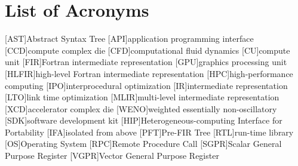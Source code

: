 \section*{List of Acronyms}

\begin{acronym}[paper]
[AST]{Abstract Syntax Tree}
[API]{application programming interface}
[CCD]{compute complex die}
[CFD]{computational fluid dynamics}
[CU]{compute unit}
[FIR]{Fortran intermediate representation}
[GPU]{graphics processing unit}
[HLFIR]{high-level Fortran intermediate representation}
[HPC]{high-performance computing}
[IPO]{interprocedural optimization}
[IR]{intermediate representation}
[LTO]{link time optimization}
[MLIR]{multi-level intermediate representation}
[XCD]{accelerator complex die}
[WENO]{weighted essentially non-oscillatory}
[SDK]{software development kit}
[HIP]{Heterogeneous-computing Interface for Portability}
[IFA]{isolated from above}
[PFT]{Pre-FIR Tree}
[RTL]{run-time library}
[OS]{Operating System}
[RPC]{Remote Procedure Call}
[SGPR]{Scalar General Purpose Register}
[VGPR]{Vector General Purpose Register}
\end{acronym}